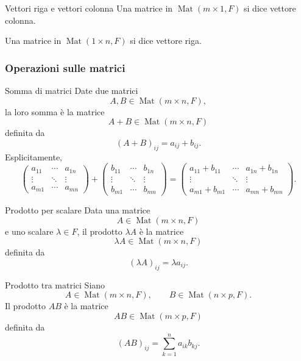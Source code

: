 \documentclass[a4paper]{article}
\begin{document}
\begin{snippetdefinition}{Vettori riga e vettori colonna}
    Una matrice in \(\operatorname{Mat}(m\times 1,F)\) si dice vettore colonna.

    Una matrice in \(\operatorname{Mat}(1\times n,F)\) si dice vettore riga.
\end{snippetdefinition}

\subsubsection{Operazioni sulle matrici}

\begin{snippetdefinition}{Somma di matrici}
    Date due matrici
    \[
        A,B\in\operatorname{Mat}(m\times n,F),
    \]
    la loro somma è la matrice
    \[
        A+B\in\operatorname{Mat}(m\times n,F)
    \]
    definita da
    \[
        (A+B)_{ij}=a_{ij}+b_{ij}.
    \]
    Esplicitamente,
    \[
        \begin{pmatrix}
            a_{11} & \cdots & a_{1n}\\
            \vdots & \ddots & \vdots\\
            a_{m1} & \cdots & a_{mn}
        \end{pmatrix}
        +
        \begin{pmatrix}
            b_{11} & \cdots & b_{1n}\\
            \vdots & \ddots & \vdots\\
            b_{m1} & \cdots & b_{mn}
        \end{pmatrix}
        =
        \begin{pmatrix}
            a_{11}+b_{11} & \cdots & a_{1n}+b_{1n}\\
            \vdots & \ddots & \vdots\\
            a_{m1}+b_{m1} & \cdots & a_{mn}+b_{mn}
        \end{pmatrix}.
    \]
\end{snippetdefinition}

\begin{snippetdefinition}{Prodotto per scalare}
    Data una matrice
    \[
        A\in\operatorname{Mat}(m\times n,F)
    \]
    e uno scalare \(\lambda\in F\), il prodotto \(\lambda A\) è la matrice
    \[
        \lambda A\in\operatorname{Mat}(m\times n,F)
    \]
    definita da
    \[
        (\lambda A)_{ij}=\lambda a_{ij}.
    \]
\end{snippetdefinition}

\begin{snippetdefinition}{Prodotto tra matrici}
    Siano
    \[
        A\in\operatorname{Mat}(m\times n,F),
        \qquad
        B\in\operatorname{Mat}(n\times p,F).
    \]
    Il prodotto \(AB\) è la matrice
    \[
        AB\in\operatorname{Mat}(m\times p,F)
    \]
    definita da
    \[
        (AB)_{ij}
        =
        \sum_{k=1}^{n} a_{ik}b_{kj}.
    \]
\end{snippetdefinition}
\end{document}
